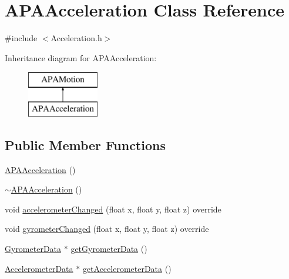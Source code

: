 \hypertarget{class_a_p_a_acceleration}{\section{A\+P\+A\+Acceleration Class Reference}
\label{class_a_p_a_acceleration}
}


{\ttfamily \#include $<$Acceleration.\+h$>$}

Inheritance diagram for A\+P\+A\+Acceleration\+:\begin{figure}[H]
\begin{center}
\leavevmode
\includegraphics[height=2.000000cm]{class_a_p_a_acceleration}
\end{center}
\end{figure}
\subsection*{Public Member Functions}
\begin{DoxyCompactItemize}
\item 
\hyperlink{class_a_p_a_acceleration_a9236a1d22e7497197df8670fc47f70b6}{A\+P\+A\+Acceleration} ()
\item 
\hyperlink{class_a_p_a_acceleration_a962402484067c595d6e4c8e1efed1f1f}{$\sim$\+A\+P\+A\+Acceleration} ()
\item 
void \hyperlink{class_a_p_a_acceleration_a02e69859d063f4c7c94fe429549da92e}{accelerometer\+Changed} (float x, float y, float z) override
\item 
void \hyperlink{class_a_p_a_acceleration_a6b09386fa27a86904279e4c4715b3b08}{gyrometer\+Changed} (float x, float y, float z) override
\item 
\hyperlink{struct_gyrometer_data}{Gyrometer\+Data} $\ast$ \hyperlink{class_a_p_a_acceleration_a116b61825f2266522cbd753e1243f8f7}{get\+Gyrometer\+Data} ()
\item 
\hyperlink{struct_accelerometer_data}{Accelerometer\+Data} $\ast$ \hyperlink{class_a_p_a_acceleration_acbdad2f91dbc8508050914748c07c9f4}{get\+Accelerometer\+Data} ()
\end{DoxyCompactItemize}


